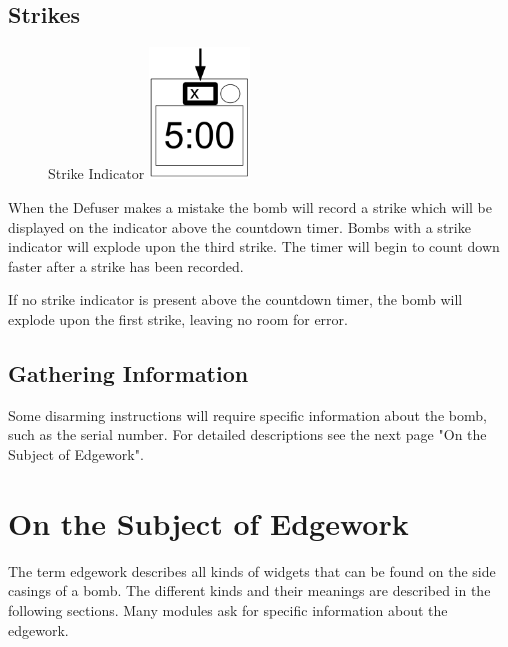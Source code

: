 \subsection*{Strikes}
\begin{figure} %
  \vspace{-2\baselineskip}
  Strike Indicator
  \centering
  \includegraphics[height=3.5cm]{modules/0_explanation/strike}
  \label{fig:Strikes}
\end{figure}
When the Defuser makes a mistake the bomb will record a strike
which will be displayed on the indicator above the countdown
timer. Bombs with a strike indicator will explode upon the
third strike. The timer will begin to count down faster after
a strike has been recorded.

If no strike indicator is present above the countdown timer,
the bomb will explode upon the first strike, leaving no room
for error.

\subsection*{Gathering Information}
Some disarming instructions will require specific information about the
bomb, such as the serial number. For detailed descriptions see the next
page "On the Subject of Edgework".

\clearpage

\section*{On the Subject of Edgework}\label{sec:on-the-subject-of-edgework}
The term edgework describes all kinds of widgets that can be found on the
side casings of a bomb. The different kinds and their meanings are
described in the following sections. Many modules ask for specific
information about the edgework.

